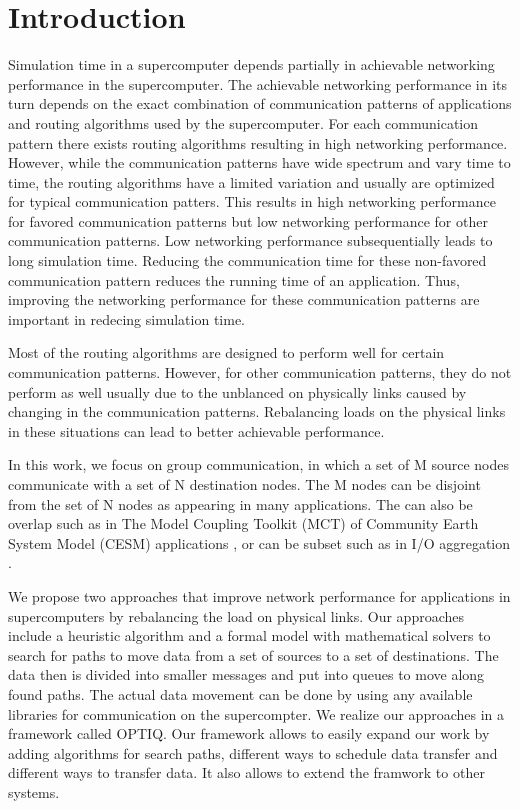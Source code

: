 \section{Introduction}
\label{sec:intro}
Simulation time in a supercomputer depends partially in achievable networking performance in the supercomputer. The achievable networking performance in its turn depends on the exact combination of communication patterns of applications and routing algorithms used by the supercomputer. For each communication pattern there exists routing algorithms resulting in high networking performance. However, while the communication patterns have wide spectrum and vary time to time, the routing algorithms have a limited variation and usually are optimized for typical communication patters. This results in high networking performance for favored communication patterns but low networking performance for other communication patterns. Low networking performance subsequentially leads to long simulation time. Reducing the communication time for these non-favored communication pattern reduces the running time of an application. Thus, improving the networking performance for these communication patterns are important in redecing simulation time. 

Most of the routing algorithms are designed to perform well for certain communication patterns. However, for other communication patterns, they do not perform as well usually due to the unblanced on physically links caused by changing in the communication patterns. Rebalancing loads on the physical links in these situations can lead to better achievable performance. 

In this work, we focus on group communication, in which a set of M source nodes communicate with a set of N destination nodes. The M nodes can be disjoint from the set of N nodes as appearing in many applications. The can also be overlap such as in The Model Coupling Toolkit (MCT) of Community Earth System Model (CESM) applications \cite{MCT:Jacob}, or can be subset such as in I/O aggregation \cite{Vishwanath:GLEAN}.

We propose two approaches that improve network performance for applications in supercomputers by rebalancing the load on physical links. Our approaches include a heuristic algorithm and a formal model with mathematical solvers to search for paths to move data from a set of sources to a set of destinations. The data then is divided into smaller messages and put into queues to move along found paths. The actual data movement can be done by using any available libraries for communication on the supercompter. We realize our approaches in a framework called OPTIQ. Our framework allows to easily expand our work by adding algorithms for search paths, different ways to schedule data transfer and different ways to transfer data. It also allows to extend the framwork to other systems.

